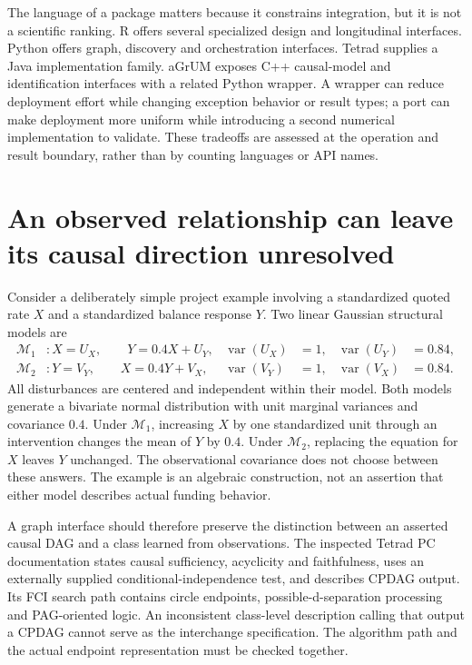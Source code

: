 The language of a package matters because it constrains integration, but it is
not a scientific ranking. R offers several specialized design and longitudinal
interfaces. Python offers graph, discovery and orchestration interfaces.
Tetrad supplies a Java implementation family. aGrUM exposes C++ causal-model
and identification interfaces with a related Python wrapper. A wrapper can
reduce deployment effort while changing exception behavior or result types;
a port can make deployment more uniform while introducing a second numerical
implementation to validate. These tradeoffs are assessed at the operation and
result boundary, rather than by counting languages or API names.

\section{An observed relationship can leave its causal direction unresolved}

Consider a deliberately simple project example involving a standardized quoted
rate \(X\) and a standardized balance response \(Y\). Two linear Gaussian
structural models are
\begin{align}
 \mathcal M_1 &: X=U_X,\qquad Y=0.4X+U_Y,
    &\operatorname{var}(U_X)&=1,&\operatorname{var}(U_Y)&=0.84,\\
 \mathcal M_2 &: Y=V_Y,\qquad X=0.4Y+V_X,
    &\operatorname{var}(V_Y)&=1,&\operatorname{var}(V_X)&=0.84.
\end{align}
All disturbances are centered and independent within their model. Both models
generate a bivariate normal distribution with unit marginal variances and
covariance \(0.4\). Under \(\mathcal M_1\), increasing \(X\) by one standardized
unit through an intervention changes the mean of \(Y\) by \(0.4\). Under
\(\mathcal M_2\), replacing the equation for \(X\) leaves \(Y\) unchanged. The
observational covariance does not choose between these answers. The example
is an algebraic construction, not an assertion that either model describes
actual funding behavior.

A graph interface should therefore preserve the distinction between an
asserted causal DAG and a class learned from observations. The inspected
Tetrad PC documentation states causal sufficiency, acyclicity and faithfulness,
uses an externally supplied conditional-independence test, and describes CPDAG
output. Its FCI search path contains circle endpoints, possible-d-separation
processing and PAG-oriented logic. An inconsistent class-level description
calling that output a CPDAG cannot serve as the interchange specification.
The algorithm path and the actual endpoint representation must be checked
together. \cite{v12_sw_tetrad}

